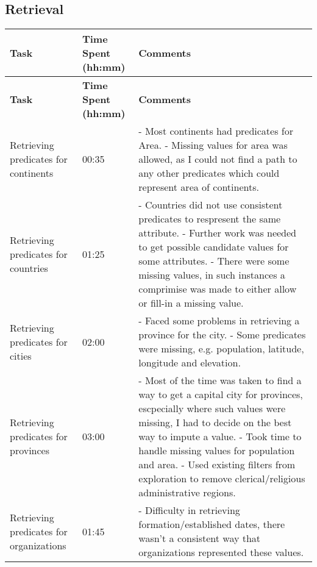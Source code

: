 \documentclass[11pt]{article}
\begin{document}
\subsection*{Retrieval}
\begin{longtable}{|p{3.9cm}|p{4.05cm}|p{6.8cm}|}
    \hline
    \textbf{Task} & \textbf{Time Spent (hh:mm)} & \textbf{Comments} \\ 
    \hline
    \endfirsthead
    
    \hline
    \textbf{Task} & \textbf{Time Spent (hh:mm)} & \textbf{Comments} \\ 
    \hline
    \endhead

    Retrieving predicates for continents & 00:35 & 
        - Most continents had predicates for Area. \newline
        - Missing values for area was allowed, as I could not find a path to any other predicates which could represent area of continents.
    \\
    \hline
    Retrieving predicates for countries & 01:25 & 
        - Countries did not use consistent predicates to respresent the same attribute. \newline
        - Further work was needed to get possible candidate values for some attributes. \newline
        - There were some missing values, in such instances a comprimise was made to either allow or fill-in a missing value.
    \\
    \hline
    Retrieving predicates for cities & 02:00 & 
        - Faced some problems in retrieving a province for the city. \newline
        - Some predicates were missing, e.g. population, latitude, longitude and elevation.
    \\
    \hline
    Retrieving predicates for provinces & 03:00 & 
        - Most of the time was taken to find a way to get a capital city for provinces, escpecially where such values were missing, I had to decide on the best way to impute a value.  \newline
        - Took time to handle missing values for population and area. \newline
        - Used existing filters from exploration to remove clerical/religious administrative regions.
    \\
    \hline
    Retrieving predicates for organizations & 01:45 & 
        - Difficulty in retrieving formation/established dates, there wasn't a consistent way that organizations represented these values.  \newline

\end{longtable}
\end{document}
